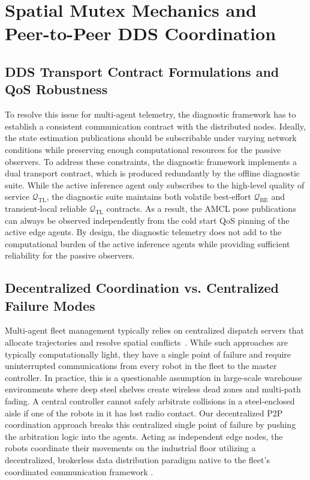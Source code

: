 \section{Spatial Mutex Mechanics and Peer-to-Peer DDS Coordination}\label{sec:ch5_spatial_mutex}

\subsection{DDS Transport Contract Formulations and QoS Robustness}

To resolve this issue for multi-agent telemetry, the diagnostic framework has to establish a consistent communication contract with the distributed nodes. Ideally, the state estimation publications should be subscribable under varying network conditions while preserving enough computational resources for the passive observers. To address these constraints, the diagnostic framework implements a dual transport contract, which is produced redundantly by the offline diagnostic suite. While the active inference agent only subscribes to the high-level quality of service $\mathcal{Q}_{\text{TL}}$, the diagnostic suite maintains both volatile best-effort $\mathcal{Q}_{\text{BE}}$ and transient-local reliable $\mathcal{Q}_{\text{TL}}$ contracts. As a result, the AMCL pose publications can always be observed independently from the cold start QoS pinning of the active edge agents. By design, the diagnostic telemetry does not add to the computational burden of the active inference agents while providing sufficient reliability for the passive observers.

\subsection{Decentralized Coordination vs. Centralized Failure Modes}

Multi-agent fleet management typically relies on centralized dispatch servers that allocate trajectories and resolve spatial conflicts~\cite{gupta2025robotfleet}. While such approaches are typically computationally light, they have a single point of failure and require uninterrupted communications from every robot in the fleet to the master controller. In practice, this is a questionable assumption in large-scale warehouse environments where deep steel shelves create wireless dead zones and multi-path fading. A central controller cannot safely arbitrate collisions in a steel-enclosed aisle if one of the robots in it has lost radio contact. Our decentralized P2P coordination approach breaks this centralized single point of failure by pushing the arbitration logic into the agents. Acting as independent edge nodes, the robots coordinate their movements on the industrial floor utilizing a decentralized, brokerless data distribution paradigm native to the fleet's coordinated communication framework \cite{macenski2022robot}. 

